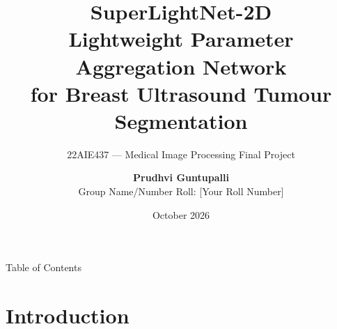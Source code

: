 \documentclass[aspectratio=169,10pt]{beamer}
\title[SuperLightNet-2D: BUSI Segmentation]{%
  \textbf{SuperLightNet-2D}\\
  {\large Lightweight Parameter Aggregation Network\\
  for Breast Ultrasound Tumour Segmentation}}
\subtitle{22AIE437 --- Medical Image Processing \quad Final Project}
\author[Prudhvi Guntupalli]{%
  \textbf{Prudhvi Guntupalli}\\[2pt]
  {\small Group Name/Number \quad Roll: [Your Roll Number]}}
\institute[Your Institution]{%
  Department of Computer Science and Engineering\\[2pt]
  [Your Institution Name]}
\date{October 2026}
\begin{document}

{
\begin{frame}[plain]
  \titlepage
\end{frame}
}

\begin{frame}{Table of Contents}
  \tableofcontents[hideallsubsections]
\end{frame}

\section{Introduction}
\end{document}
